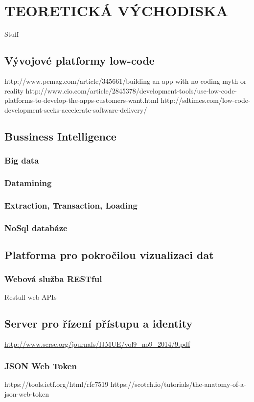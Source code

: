 \chapter{TEORETICKÁ VÝCHODISKA}
\par Stuff

\section{Vývojové platformy low-code}
http://www.pcmag.com/article/345661/building-an-app-with-no-coding-myth-or-reality
http://www.cio.com/article/2845378/development-tools/use-low-code-platforms-to-develop-the-apps-customers-want.html
http://sdtimes.com/low-code-development-seeks-accelerate-software-delivery/

\section{Bussiness Intelligence}

\subsection{Big data}

\subsection{Datamining}

\subsection{Extraction, Transaction, Loading}

\subsection{NoSql databáze}
\cite{nosql}

\section{Platforma pro pokročilou vizualizaci dat}
\subsection{Webová služba RESTful}
Restufl web APIs

\section{Server pro řízení přístupu a identity}
\url{http://www.sersc.org/journals/IJMUE/vol9_no9_2014/9.pdf}

\subsection{JSON Web Token}
https://tools.ietf.org/html/rfc7519
https://scotch.io/tutorials/the-anatomy-of-a-json-web-token
